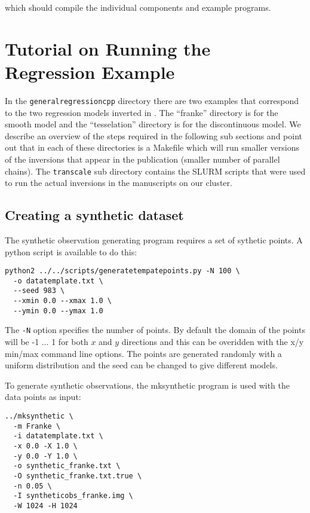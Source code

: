 \documentclass[a4paper,12pt]{article}
\begin{document}
which should compile the individual components and example programs.

\section{Tutorial on Running the Regression Example}

In the {\tt generalregressioncpp} directory there are two examples that
correspond to the two regression models inverted in \citet{Hawkins:2018:B}.
The ``franke'' directory is for the smooth model and the ``tesselation''
directory is for the discontinuous model. We describe an overview of the
steps required in the following sub sections and point out that
in each of these directories is a Makefile which will run smaller
versions of the inversions that appear in the publication (smaller number
of parallel chains). The {\tt transcale} sub directory contains the
SLURM scripts that were used to run the actual inversions in the
manuscripts on our cluster.

\subsection{Creating a synthetic dataset}

The synthetic observation generating program requires a set of
sythetic points. A python script is available to do this:

\begin{verbatim}
python2 ../../scripts/generatetempatepoints.py -N 100 \
  -o datatemplate.txt \
  --seed 983 \
  --xmin 0.0 --xmax 1.0 \
  --ymin 0.0 --ymax 1.0 
\end{verbatim}

The {\tt -N} option specifies the number of points. By default the domain
of the points will be -1 $\ldots$ 1 for both $x$ and $y$ directions and this
can be overidden with the x/y min/max command line options. The points are generated
randomly with a uniform distribution and the seed can be changed to give different models.

To generate synthetic observations, the mksynthetic program is used with the
data points as input:

\begin{verbatim}
../mksynthetic \
  -m Franke \
  -i datatemplate.txt \
  -x 0.0 -X 1.0 \
  -y 0.0 -Y 1.0 \
  -o synthetic_franke.txt \
  -O synthetic_franke.txt.true \
  -n 0.05 \
  -I syntheticobs_franke.img \
  -W 1024 -H 1024
\end{verbatim}
\end{document}
